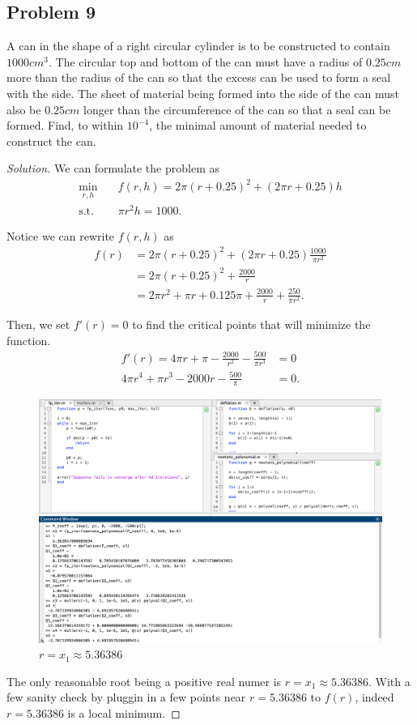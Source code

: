 \documentclass{article}
\begin{document}
\subsection*{Problem 9}
A can in the shape of a right circular cylinder is to be constructed to contain $1000 cm^3$. 
The circular top and bottom of the can must have a radius of $0.25 cm$ more than the radius of the 
can so that the excess can be used to form a seal with the side. The sheet of material being formed 
into the side of the can must also be $0.25 cm$ longer than the circumference of the can so that a 
seal can be formed. Find, to within $10^{-4}$, the minimal amount of material needed to construct 
the can.
\begin{proof}[Solution]
    We can formulate the problem as 
    \begin{align*}
        \min_{r,h} & \quad f(r, h) = 2\pi (r+0.25)^2+(2\pi r+0.25)h \\
        \text{s.t.} & \quad \pi r^2h=1000.
    \end{align*}

    Notice we can rewrite $f(r,h)$ as 
    \begin{align*}
        f(r) & = 2\pi (r+0.25)^2+(2\pi r+0.25)\frac{1000}{\pi r^2} \\
        & = 2\pi (r+0.25)^2+\frac{2000}{r} \\
        & = 2\pi r^2 + \pi r + 0.125\pi + \frac{2000}{r} + \frac{250}{\pi r^2}.
    \end{align*}
    
    Then, we set $f'(r) = 0$ to find the critical points that will minimize the function.
    \begin{align*}
        f'(r) = 4\pi r + \pi - \frac{2000}{r^2} - \frac{500}{\pi r^3} & = 0 \\
        4\pi r^4 + \pi r^3 - 2000r - \frac{500}{\pi} & = 0.
    \end{align*}
    
    \begin{figure}[htb!]
        \centering
        \includegraphics[scale=0.25]{2.6.9_1.png}
        \caption{$r = x_1 \approx 5.36386$}
    \end{figure}

    The only reasonable root being a positive real numer is $r = x_1 \approx 5.36386$. With a few 
    sanity check by pluggin in a few points near $r = 5.36386$ to $f(r)$, indeed 
    $r = 5.36386$ is a local minimum.
    
\end{proof}
\end{document}
